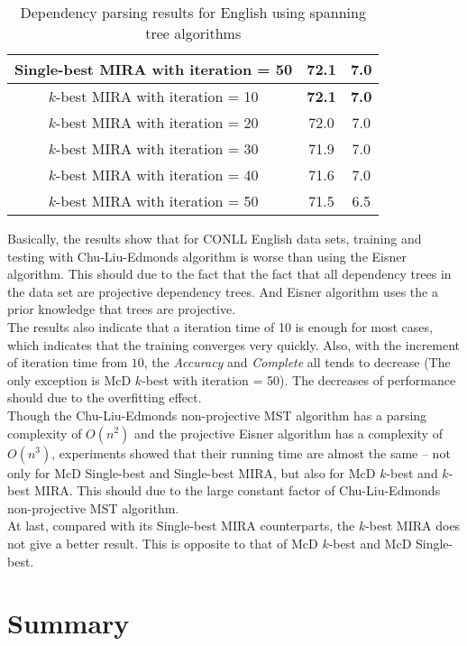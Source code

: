 \documentclass[12pt]{article}
\begin{document}
\begin{table}[htb!]
\begin{center}
\begin{tabular}{|c|c|c|}
Single-best MIRA with iteration = 50 & 72.1     & 7.0      \\ \hline
$k$-best MIRA with iteration = 10    & {\bf 72.1} & {\bf 7.0}  \\ \hline
$k$-best MIRA with iteration = 20    & 72.0     & 7.0      \\ \hline
$k$-best MIRA with iteration = 30    & 71.9     & 7.0      \\ \hline
$k$-best MIRA with iteration = 40    & 71.6     & 7.0      \\ \hline
$k$-best MIRA with iteration = 50    & 71.5     & 6.5      \\ \hline
    \end{tabular}
  \end{center}
  \caption{Dependency parsing results for English using spanning tree algorithms \label{tab:res}}
\end{table}

Basically, the results show that for CONLL English data sets, training and testing with Chu-Liu-Edmonds algorithm is worse than using the Eisner algorithm. This should due to the fact that the fact that all dependency trees in the data set are projective dependency trees. And Eisner algorithm uses the a prior knowledge that trees are projective. \\

The results also indicate that a iteration time of 10 is enough for most cases, which indicates that the training converges very quickly. Also, with the increment of iteration time from $10$, the \emph {Accuracy} and \emph {Complete} all tends to decrease (The only exception is McD $k$-best with iteration = 50). The decreases of performance should due to the overfitting effect. \\

Though the Chu-Liu-Edmonds non-projective MST algorithm has a parsing complexity of $O(n^2)$ and the projective Eisner algorithm has a complexity of $O(n^3)$, experiments showed that their running time are almost the same -- not only for McD Single-best and Single-best MIRA, but also for McD $k$-best and $k$-best MIRA. This should due to the large constant factor of Chu-Liu-Edmonds non-projective MST algorithm. \\

At last, compared with its Single-best MIRA counterparts, the $k$-best MIRA does not give a better result. This is opposite to that of McD $k$-best and McD Single-best. 

\section{Summary}
\end{document}
